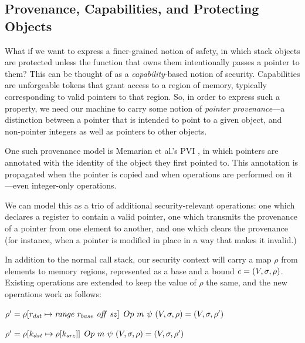 \documentclass[10pt,conference]{ieeetran}%
\theoremstyle{definition}
\begin{document}



\appendix

\subsection{Provenance, Capabilities, and Protecting Objects}
\label{app:ptr}

What if we want to express a finer-grained notion of safety, in which
stack objects are protected unless the function that owns them intentionally
passes a pointer to them? This can be thought of as a {\it capability}-based
notion of security. Capabilities are unforgeable tokens that grant access to
a region of memory, typically corresponding to valid pointers to that region.
So, in order to express such a property, we need our machine to carry some notion
of {\it pointer provenance}---a distinction between a pointer that is intended to
point to a given object, and non-pointer integers as well as pointers to other objects.

One such provenance model is Memarian et al.'s PVI \cite{}, in which pointers are
annotated with the identity of the object they first pointed to. This annotation is
propagated when the pointer is copied and when operations are performed on it---even
integer-only operations.

We can model this as a trio of additional security-relevant operations: one which
declares a register to contain a valid pointer, one which transmits the provenance
of a pointer from one element to another, and one which clears the provenance
(for instance, when a pointer is modified in place in a way that makes it invalid.)

In addition to the normal call stack, our security context will carry a map \(\rho\) from
elements to memory regions, represented as a base and a bound \(\mathit{c} = (V, \sigma, \rho)\).
Existing operations are extended to keep the value of \(\rho\) the same, and the new operations
work as follows:

           {\(\rho' = \rho[r_{dst} \mapsto \mathit{range} ~ r_{base} ~ \mathit{off} ~ \mathit{sz}]\)}
           {\(Op ~ m ~ \psi ~ (V,\sigma,\rho) = (V,\sigma,\rho')\)}

           {\(\rho' = \rho[k_{dst} \mapsto \rho[k_{src}]]\)}
           {\(Op ~ m ~ \psi ~ (V,\sigma,\rho) = (V,\sigma,\rho')\)}
\end{document}
